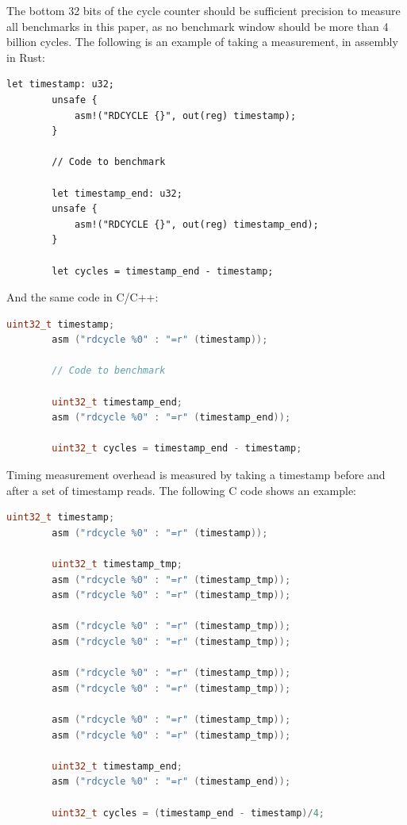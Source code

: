 \documentclass{article}
\begin{document}
The bottom 32 bits of the cycle counter should be sufficient precision to measure all benchmarks in this paper, as no benchmark window should be more than 4 billion cycles. The following is an example of taking a measurement, in assembly in Rust:

\begin{lstlisting}[]
        let timestamp: u32;
        unsafe {
            asm!("RDCYCLE {}", out(reg) timestamp);
        }
    
        // Code to benchmark
    
        let timestamp_end: u32;
        unsafe {
            asm!("RDCYCLE {}", out(reg) timestamp_end);
        }
    
        let cycles = timestamp_end - timestamp;
\end{lstlisting}

And the same code in C/C++:

\begin{lstlisting}[language=c]
        uint32_t timestamp;
        asm ("rdcycle %0" : "=r" (timestamp));
    
        // Code to benchmark
    
        uint32_t timestamp_end;
        asm ("rdcycle %0" : "=r" (timestamp_end));
    
        uint32_t cycles = timestamp_end - timestamp;
\end{lstlisting}

Timing measurement overhead is measured by taking a timestamp before and after a set of timestamp reads. The following C code shows an example:

\begin{lstlisting}[language=c]
        uint32_t timestamp;
        asm ("rdcycle %0" : "=r" (timestamp));
    
        uint32_t timestamp_tmp;
        asm ("rdcycle %0" : "=r" (timestamp_tmp));
        asm ("rdcycle %0" : "=r" (timestamp_tmp));
        
        asm ("rdcycle %0" : "=r" (timestamp_tmp));
        asm ("rdcycle %0" : "=r" (timestamp_tmp));
        
        asm ("rdcycle %0" : "=r" (timestamp_tmp));
        asm ("rdcycle %0" : "=r" (timestamp_tmp));
        
        asm ("rdcycle %0" : "=r" (timestamp_tmp));
        asm ("rdcycle %0" : "=r" (timestamp_tmp));
    
        uint32_t timestamp_end;
        asm ("rdcycle %0" : "=r" (timestamp_end));
    
        uint32_t cycles = (timestamp_end - timestamp)/4;
\end{lstlisting}
\end{document}

